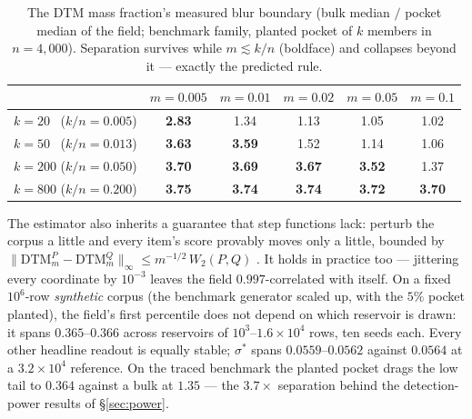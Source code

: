 \documentclass[11pt,letterpaper]{article}
\newcommand{\dtm}{\mathrm{DTM}}
\newcommand{\sstar}{\sigma^{*}}
\begin{document}
\begin{table}[t]
\centering
\caption{The DTM mass fraction's measured blur boundary (bulk median $/$
pocket median of the field; benchmark family, planted pocket of $k$ members
in $n = 4{,}000$). Separation survives while $m \lesssim k/n$ (boldface) and
collapses beyond it --- exactly the predicted rule.}
\label{tab:mrule}
\small
\begin{tabular}{lccccc}
\toprule
& $m{=}0.005$ & $m{=}0.01$ & $m{=}0.02$ & $m{=}0.05$ & $m{=}0.1$\\
\midrule
$k=20$ \ ($k/n{=}0.005$) & \textbf{2.83} & 1.34 & 1.13 & 1.05 & 1.02\\
$k=50$ \ ($k/n{=}0.013$) & \textbf{3.63} & \textbf{3.59} & 1.52 & 1.14 & 1.06\\
$k=200$ ($k/n{=}0.050$) & \textbf{3.70} & \textbf{3.69} & \textbf{3.67} & \textbf{3.52} & 1.37\\
$k=800$ ($k/n{=}0.200$) & \textbf{3.75} & \textbf{3.74} & \textbf{3.74} & \textbf{3.72} & \textbf{3.70}\\
\bottomrule
\end{tabular}
\end{table} The estimator also inherits a guarantee that step functions lack: perturb
the corpus a little and every item's score provably moves only a little,
bounded by $\lVert \dtm^P_m - \dtm^Q_m\rVert_\infty \le m^{-1/2}\,
W_2(P, Q)$ \cite{chazal2011}. It holds in practice too --- jittering
every coordinate by $10^{-3}$ leaves the field $0.997$-correlated with
itself. On a fixed $10^6$-row \emph{synthetic} corpus (the benchmark generator
scaled up, with the $5\%$ pocket planted), the field's first percentile
does not depend on which reservoir is drawn: it spans
$0.365$--$0.366$ across reservoirs of $10^3$--$1.6{\times}10^4$ rows,
ten seeds each. Every other headline readout is equally stable;
$\sstar$ spans $0.0559$--$0.0562$ against $0.0564$ at a
$3.2{\times}10^4$ reference. On
the traced benchmark the planted pocket drags the low tail to $0.364$
against a bulk at $1.35$ --- the $3.7\times$ separation behind the
detection-power results of \S\ref{sec:power}.
\end{document}
